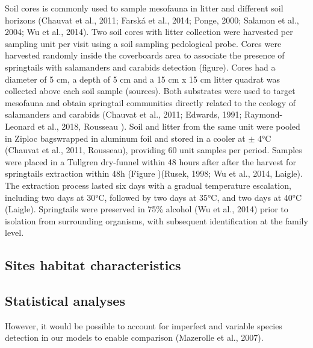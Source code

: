 Soil cores is commonly used to sample mesofauna in litter and different soil horizons (Chauvat et al., 2011; Farská et al., 2014; Ponge, 2000; Salamon et al., 2004; Wu et al., 2014). 
Two soil cores with litter collection were harvested per sampling unit per visit using a soil sampling pedological probe. 
Cores were harvested randomly inside the coverboards area to associate the presence of springtails with salamanders and carabids detection (figure). 
Cores had a diameter of 5 cm, a depth of 5 cm and a 15 cm x 15 cm litter quadrat was collected above each soil sample (sources).
Both substrates were used to target mesofauna and obtain springtail communities directly related to the ecology of salamanders and carabids (Chauvat et al., 2011; Edwards, 1991; Raymond-Leonard et al., 2018, Rousseau ).
Soil and litter from the same unit were pooled in Ziploc bagswrapped in aluminum foil and stored in a cooler at $\pm$ 4°C (Chauvat et al., 2011, Rousseau), providing 60 unit samples per period.
Samples were placed in a Tullgren dry-funnel within 48 hours after after the harvest for springtails extraction within 48h (Figure )(Rusek, 1998; Wu et al., 2014, Laigle). 
The extraction process lasted six days with a gradual temperature escalation, including two days at 30°C, followed by two days at 35°C, and two days at 40°C (Laigle).
Springtails were preserved in 75\% alcohol (Wu et al., 2014) prior to isolation from surrounding organisms, with subsequent identification at the family level.




\subsection*{Sites habitat characteristics}
\label{subsec:habitat}


\subsection*{Statistical analyses}
\label{subsec:analyses}
However, it would be possible to account for imperfect and variable species detection in our models to enable comparison (Mazerolle et al., 2007).

